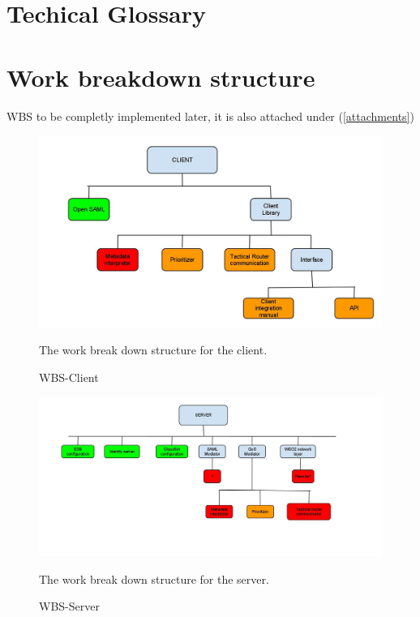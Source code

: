 \documentclass[12pt]{article}
\begin{document}
\appendix
\section{Techical Glossary}\label{glossary}
    
\section{Work breakdown structure}\label{wbs}
    WBS to be completly implemented later, it is also attached under (\ref{attachments})
    
        \begin{figure}[htb]
            \centering
            \includegraphics[scale=0.3]{wbsClient}
            \caption{WBS-Client}
            The work break down structure for the client.
            \label{fig:wbsClient}
        \end{figure}
        
        \begin{figure}[htb]
            \centering
            \includegraphics[scale=0.3]{wbsServer}
            \caption{WBS-Server}
            The work break down structure for the server.
            \label{fig:wbdServer}
        \end{figure}
    
\end{document}
